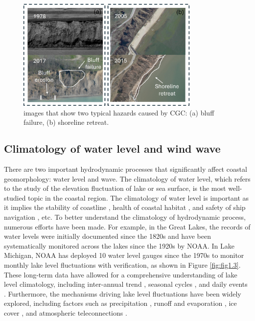 \begin{figure}[htbp]
  \centering
  \includegraphics[width=0.8\textwidth]{chapter1/resources/figure1-2.jpg}
  \caption{images that show two typical hazards caused by CGC: (a) bluff failure, (b) shoreline retreat.}
  \label{fig:fig1.2}
\end{figure}


\subsection{Climatology of water level and wind wave}
\label{subsec:Climatology of water level and wind wave}

There are two important hydrodynamic processes that significantly affect coastal
geomorphology: water level and wave. The climatology of water level, which
refers to the study of the elevation fluctuation of lake or sea surface, is the
most well-studied topic in the coastal region. The climatology of water level is
important as it implies the stability of coastline
\citep{krueger2020coastal,meadows_relationship_1997}, health of coastal habitat
\citep{theuerkauf_rapid_2021,keddy1986great,frieswyk2007vegetation}, and safety
of ship navigation \citep{posey2012climate,parker1998modern}, etc. To better
understand the climatology of hydrodynamic process, numerous efforts have been
made. For example, in the Great Lakes, the records of water levels were
initially documented since the 1820s \citep{foster_report_1851} and have been
systematically monitored across the lakes since the 1920s by NOAA. In Lake
Michigan, NOAA has deployed 10 water level gauges since the 1970s to monitor
monthly lake level fluctuations with verification, as shown in Figure
\ref{fig:fig1.3}. These long-term data have allowed for a comprehensive
understanding of lake level climatology, including inter-annual trend
\citep{hanrahan_attribution_2014,chen_understanding_2022}, seasonal cycles
\citep{argyilan_lake_2003,quinn_secular_2002}, and daily events
\citep{trebitz_characterizing_2006}. Furthermore, the mechanisms driving lake
level fluctuations have been widely explored, including factors such as
precipitation \citep{rodionov_association_1994,hanrahan_attribution_2014},
runoff and evaporation
\citep{gronewold_tug--war_2021,gronewold_hydrological_2016,cheng_effects_2021},
ice cover \citep{farhadzadeh_study_2017}, and atmospheric teleconnections
\citep{ghanbari_coherence_2008}.

